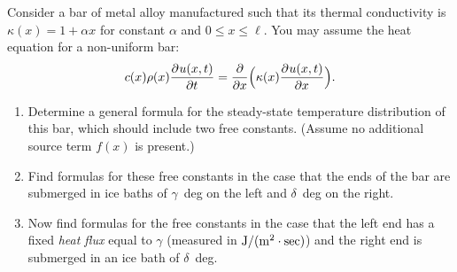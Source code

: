 Consider a bar of metal alloy manufactured such that its thermal conductivity
is $\kappa(x) = 1+\alpha x$ for constant $\alpha$ and $0\le x\le \ell$.
You may assume the heat equation for a non-uniform bar:
\[ c(x) \rho(x) \frac{\partial^{} u(x,t)}{\partial t^{}} = {\partial \over \partial x} \Big(\kappa(x) \frac{\partial^{} u(x,t)}{\partial x^{}}\Big).\]
\begin{enumerate}
\item Determine a general formula for the steady-state temperature distribution 
      of this bar, which should include two free constants.  
      (Assume no additional source term $f(x)$ is present.) 
\item Find formulas for these free constants in the case that the ends of the bar are
      submerged in ice baths of $\gamma$~deg on the left and $\delta$~deg on the right.
\item Now find formulas for the free constants in the case that the left end has a fixed 
      \emph{heat flux} equal to $\gamma$ (measured in ${\rm J}/({\rm m}^2\cdot {\rm sec})$)
      and the right end is submerged in an ice bath of $\delta$~deg.
\end{enumerate}



